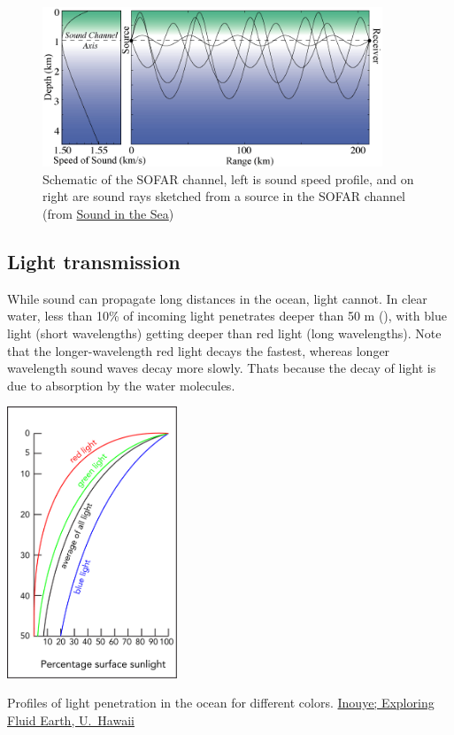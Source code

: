 \begin{figure}[hbtp]
  \begin{center}
    \includegraphics[width=4in]{./figs/sofar-color-big.png}
    \caption{Schematic of the SOFAR channel, left is sound speed profile, and on right are sound rays sketched from a source in the SOFAR channel (from \href{https://dosits.org/science/movement/sofar-channel/}{Sound in the Sea}) }
    \label{fig:sofar}
  \end{center}
\end{figure}

\subsection{Light transmission}


While sound can propagate long distances in the ocean, light cannot.  In clear water, less than 10\% of incoming light penetrates deeper than 50 m (), with blue light (short wavelengths) getting deeper than red light (long wavelengths). Note that the longer-wavelength red light decays the fastest, whereas longer wavelength sound waves decay more slowly.  Thats because the decay of light is due to absorption by the water molecules. 

\begin{marginfigure}
    \includegraphics[width=2.0in]{figs/Light-Intensity.png}
    \caption{Profiles of light penetration in the ocean for different colors.  \href{https://manoa.hawaii.edu/exploringourfluidearth/media_colorbox/2788/media_original/en}{Inouye; Exploring Fluid Earth, U.\ Hawaii}}
    \label{fig:Light-Intensity}
\end{marginfigure}

